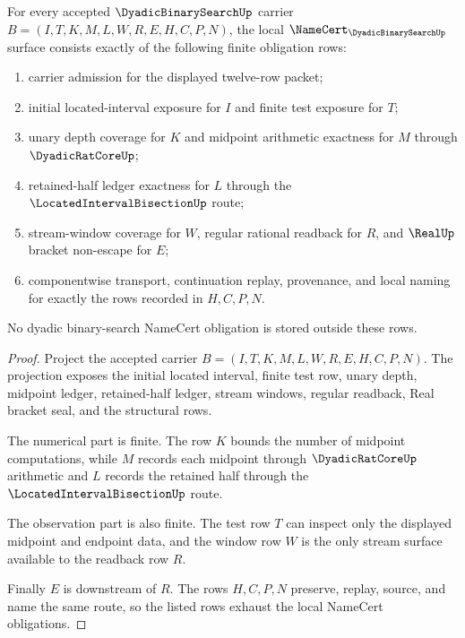 \begin{theorem}
\label{thm:dyadic-binary-search-namecert-obligations}
For every accepted $\DyadicBinarySearchUp$ carrier $B=(I,T,K,M,L,W,R,E,H,C,P,N)$, the local $\NameCert_{\DyadicBinarySearchUp}$ surface consists exactly of the following finite obligation rows:
\begin{enumerate}
\item carrier admission for the displayed twelve-row packet;
\item initial located-interval exposure for $I$ and finite test exposure for $T$;
\item unary depth coverage for $K$ and midpoint arithmetic exactness for $M$ through $\DyadicRatCoreUp$;
\item retained-half ledger exactness for $L$ through the $\LocatedIntervalBisectionUp$ route;
\item stream-window coverage for $W$, regular rational readback for $R$, and $\RealUp$ bracket non-escape for $E$;
\item componentwise transport, continuation replay, provenance, and local naming for exactly the rows recorded in $H,C,P,N$.
\end{enumerate}
No dyadic binary-search NameCert obligation is stored outside these rows.
\end{theorem}
\begin{proof}
Project the accepted carrier $B=(I,T,K,M,L,W,R,E,H,C,P,N)$. The projection exposes the initial located interval, finite test row, unary depth, midpoint ledger, retained-half ledger, stream windows, regular readback, Real bracket seal, and the structural rows.

The numerical part is finite. The row $K$ bounds the number of midpoint computations, while $M$ records each midpoint through $\DyadicRatCoreUp$ arithmetic and $L$ records the retained half through the $\LocatedIntervalBisectionUp$ route.

The observation part is also finite. The test row $T$ can inspect only the displayed midpoint and endpoint data, and the window row $W$ is the only stream surface available to the readback row $R$.

Finally $E$ is downstream of $R$. The rows $H,C,P,N$ preserve, replay, source, and name the same route, so the listed rows exhaust the local NameCert obligations.
\end{proof}

